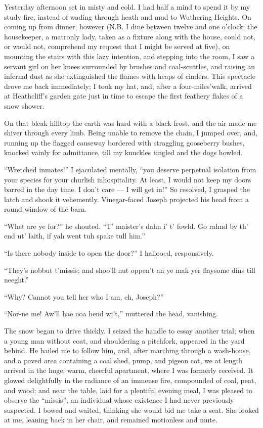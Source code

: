 \par Yesterday afternoon set in misty and cold. I had half a mind to spend it by my study fire, instead of wading through heath and mud to Wuthering Heights. On coming up from dinner, however (N.B. I dine between twelve and one o'clock; the housekeeper, a matronly lady, taken as a fixture along with the house, could not, or would not, comprehend my request that I might be served at five), on mounting the stairs with this lazy intention, and stepping into the room, I saw a servant girl on her knees surrounded by brushes and coal-scuttles, and raising an infernal dust as she extinguished the flames with heaps of cinders. This spectacle drove me back immediately; I took my hat, and, after a four-miles'walk, arrived at Heathcliff's garden gate just in time to escape the first feathery flakes of a snow shower.
\par On that bleak hilltop the earth was hard with a black frost, and the air made me shiver through every limb. Being unable to remove the chain, I jumped over, and, running up the flagged causeway bordered with straggling gooseberry bushes, knocked vainly for admittance, till my knuckles tingled and the dogs howled.
\par “Wretched inmates!” I ejaculated mentally, “you deserve perpetual isolation from your species for your churlish inhospitality. At least, I would not keep my doors barred in the day time. I don't care — I will get in!” So resolved, I grasped the latch and shook it vehemently. Vinegar-faced Joseph projected his head from a round window of the barn.
\par “Whet are ye for?” he shouted. “T' maister's dahn i' t' fowld. Go rahnd by th' end ut' laith, if yah went tuh spake tull him.”
\par “Is there nobody inside to open the door?” I hallooed, responsively.
\par “They's nobbut t'missis; and shoo'll nut oppen't an ye mak yer flaysome dins till neeght.”
\par “Why? Cannot you tell her who I am, eh, Joseph?”
\par “Nor-ne me! Aw'll hae noa hend wi't,” muttered the head, vanishing.
\par The snow began to drive thickly. I seized the handle to essay another trial; when a young man without coat, and shouldering a pitchfork, appeared in the yard behind. He hailed me to follow him, and, after marching through a wash-house, and a paved area containing a coal shed, pump, and pigeon cot, we at length arrived in the huge, warm, cheerful apartment, where I was formerly received. It glowed delightfully in the radiance of an immense fire, compounded of coal, peat, and wood; and near the table, laid for a plentiful evening meal, I was pleased to observe the “missis”, an individual whose existence I had never previously suspected. I bowed and waited, thinking she would bid me take a seat. She looked at me, leaning back in her chair, and remained motionless and mute.
